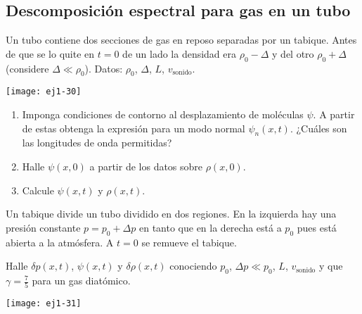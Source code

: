 \subsection*{Descomposición espectral para gas en un tubo}

\item
\begin{minipage}[t][1.6cm]{0.65\textwidth}
Un tubo contiene dos secciones de gas en reposo separadas por un tabique.
Antes de que se lo quite en $t=0$ de un lado la densidad era $\rho_{0}-\Delta$ y del otro $\rho_{0}+\Delta$ (considere $\Delta\ll\rho_{0}$).
Datos: $\rho_{0}$, $\Delta$, $L$, $v_\text{sonido}$.
\end{minipage}
\begin{minipage}[c][2cm][t]{0.3\textwidth}
	\texttt{[image: ej1-30]}
\end{minipage}
\begin{enumerate}
	\item Imponga condiciones de contorno al desplazamiento de moléculas $\psi$.
	A partir de estas obtenga la expresión para un modo normal $\psi_{n}(x,t)$.
	¿Cuáles son las longitudes de onda permitidas?
	\item Halle $\psi(x,0)$ a partir de los datos sobre $\rho(x,0)$.
	\item Calcule $\psi(x,t)$ y $\rho(x,t)$.
\end{enumerate}


\item
\begin{minipage}[t][2cm]{0.65\textwidth}
Un tabique divide un tubo dividido en dos regiones.
En la izquierda hay una presión constante $p = p_0 + \Delta p$ en tanto que en la derecha está a $p_0$ pues está abierta a la atmósfera.
A $t = 0$ se remueve el tabique.

Halle $\delta p(x,t)$, $\psi(x,t)$ y $\delta\rho(x,t)$ conociendo $p_0$, $\Delta p\ll p_0$, $L$, $v_\text{sonido}$ y que $\gamma= \frac{7}{5}$ para un gas diatómico.
\end{minipage}
\begin{minipage}[c][0.6cm][t]{0.3\textwidth}
	\texttt{[image: ej1-31]}
\end{minipage}


